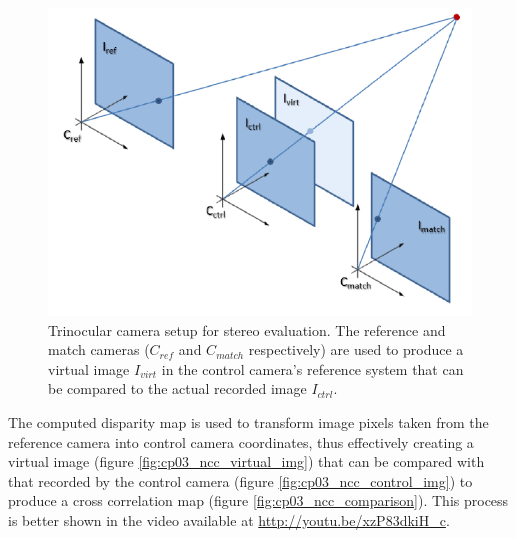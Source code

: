 \begin{figure}[h!]
\centering
\includegraphics{trinocular_setup}
\caption{Trinocular camera setup for stereo evaluation. The reference and match cameras ($C_{ref}$ and $C_{match}$ respectively) are used to produce a virtual image $I_{virt}$ in the control camera’s reference system that can be compared to the actual recorded image $I_{ctrl}$.}\label{fig:cp03_trinocular_setup}
\end{figure}
   
The computed disparity map is used to transform image pixels taken from the reference camera into control camera coordinates, thus effectively creating a virtual image (figure \ref{fig:cp03_ncc_virtual_img}) that can be compared with that recorded by the control camera (figure \ref{fig:cp03_ncc_control_img}) to produce a cross correlation map (figure \ref{fig:cp03_ncc_comparison}). This process is better shown in the video available at \url{http://youtu.be/xzP83dkiH_c}.

